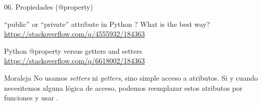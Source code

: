 \begin{frame}{06. Propiedades (@property)}
  \footnotesize
  \begin{block}{\centering ``public'' or ``private'' attribute in Python ? What is the best way?}
    \centering \url{https://stackoverflow.com/q/4555932/184363}
  \end{block}

  \begin{block}{\centering Python @property versus getters and setters}
    \centering \url{https://stackoverflow.com/q/6618002/184363}
  \end{block}

  \normalsize
  \begin{alertblock}{\centering Moraleja}
    \centering
    No usamos \textit{setters} ni \textit{getters}, sino simple acceso
    a atributos. Si y cuando necesitemos alguna lógica de acceso,
    podemos reemplazar estos atributos por funciones y usar
    .
  \end{alertblock}
\end{frame}

